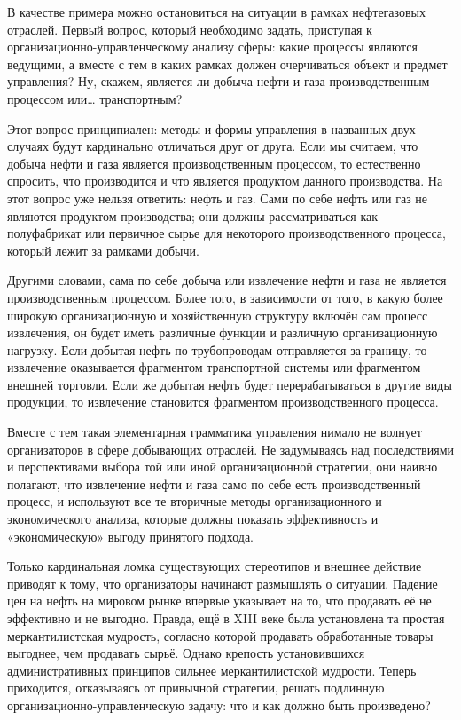 \documentclass[11pt,a4paper]{article}
\begin{document}
В качестве примера можно остановиться на ситуации в рамках нефтегазовых
отраслей. Первый вопрос, который необходимо задать, приступая к
организационно-управленчес\-кому анализу сферы: какие процессы являются
ведущими, а вместе с тем в каких рамках должен очерчиваться объект и предмет
управления? Ну, скажем, является ли добыча нефти и газа производственным
процессом или… транспортным? 

Этот вопрос принципиален: методы и формы управления в названных двух случаях
будут кардинально отличаться друг от друга. Если мы считаем, что добыча нефти
и газа является производственным процессом, то естественно спросить, что
производится и что является продуктом данного производства. На этот вопрос уже
нельзя ответить: нефть и газ. Сами по себе нефть или газ не являются продуктом
производства; они должны рассматриваться как полуфабрикат или первичное сырье
для некоторого производственного процесса, который лежит за рамками добычи. 

Другими словами, сама по себе добыча или извлечение нефти и газа не является
производственным процессом. Более того, в зависимости от того, в какую более
широкую организационную и хозяйственную структуру включён сам процесс
извлечения, он будет иметь различные функции и различную организационную
нагрузку. Если добытая нефть по трубопроводам отправляется за границу, то
извлечение оказывается фрагментом транспортной системы или фрагментом внешней
торговли. Если же добытая нефть будет перерабатываться в другие виды
продукции, то извлечение становится фрагментом производственного процесса. 

Вместе с тем такая элементарная грамматика управления нимало не волнует
организаторов в сфере добывающих отраслей. Не задумываясь над последствиями и
перспективами выбора той или иной организационной стратегии, они наивно
полагают, что извлечение нефти и газа само по себе есть производственный
процесс, и используют все те вторичные методы организационного и
экономического анализа, которые должны показать эффективность и
«экономическую» выгоду принятого подхода. 

Только кардинальная ломка существующих стереотипов и внешнее действие приводят
к тому, что организаторы начинают размышлять о ситуации. Падение цен на нефть
на мировом рынке впервые указывает на то, что продавать её не эффективно и не
выгодно. Правда, ещё в XIII веке была установлена та простая меркантилистская
мудрость, согласно которой продавать обработанные товары выгоднее, чем
продавать сырьё. Однако крепость установившихся административных принципов
сильнее меркантилистской мудрости. Теперь приходится, отказываясь от привычной
стратегии, решать подлинную организационно-управленческую задачу: что и как
должно быть произведено? 
\end{document}
